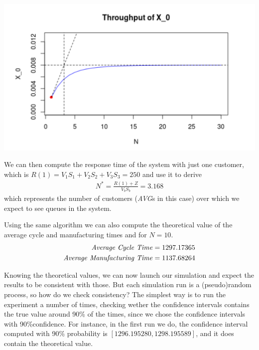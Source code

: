 \documentclass[paper=a4, fontsize=11pt]{scrartcl}
\numberwithin{equation}{section}		%
\numberwithin{figure}{section}			%
\numberwithin{table}{section}				%
\begin{document}
\includegraphics[width=\textwidth]{"img/X0"}

We can then compute the response time of the system with just one customer, which is $R(1) = V_1 S_1 + V_2 S_2 + V_3 S_3 = 250$ and use it to derive
\begin{align}
N^* = \frac{R(1) + Z}{V_b S_b} = 3.168
\end{align}
which represents the number of customers (\textit{AVG}s in this case) over which we expect to see queues in the system.

Using the same algorithm we can also compute the theoretical value of the average cycle and manufacturing times and  for $N = 10$.
\begin{align}
\text{\textit{Average Cycle Time}} = 1297.17365 \\
\text{\textit{Average Manufacturing Time}} = 1137.68264
\end{align}

Knowing the theoretical values, we can now launch our simulation and expect the results to be consistent with those. But each simulation run is a (pseudo)random process, so how do we check consistency? The simplest way is to run the experiment a number of times, checking wether the confidence intervals contains the true value around 90\% of the times, since we chose the confidence intervals with 90\%confidence. For instance, in the first run we do, the confidence interval computed with 90\% probability is $\left[1296.195280, 1298.195589\right]$, and it does contain the theoretical value.
\end{document}
